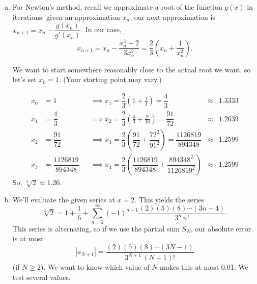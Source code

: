 \begin{solution}

	\begin{enumerate}[(a)]
		\item
		For Newton's method, recall we approximate a root of the function $g(x)$ in iterations: given an approximation $x_n$, our next approximation is $x_{n+1}=x_n-\dfrac{g(x_n)}{g'(x_n)}$. In our case,
\[x_{n+1}=x_n - \frac{x_n^3-2}{3x_n^2}=\frac23\left(x_n+\frac{1}{x_n^2}\right).\]

We want to start somewhere reasonably close to the actual root we want, so let's set $x_0=1$. (Your starting point may vary.)

\begin{align*}
x_0&=1 &&\implies x_1=\dfrac23\left(1+\frac11\right)=\dfrac{4}{3}&\approx&1.3333\\
 x_1&=\dfrac43 &&\implies x_2=\dfrac23\left(\frac43+\frac{9}{16}\right)=\dfrac{91}{72}&\approx&1.2639\\
  x_2&=\dfrac{91}{72} &&\implies x_3=\dfrac23\left(\dfrac{91}{72}+\dfrac{72^2}{91^2}\right)=\dfrac{1126819 }{894348 }&\approx&1.2599\\
    x_3&=\dfrac{1126819 }{894348 } &&\implies x_4=\dfrac23\left(\dfrac{1126819 }{894348 }+\dfrac{894348^2}{1126819^2}\right)&\approx&1.2599
\end{align*}
So, $\sqrt[3]{2}\approx 1.26$.
		\item
		We'll evaluate the given series at $x=2$. This yields the series
		\[\sqrt[3]{2}=1+\frac{1}{6}+\sum_{n=2}^\infty(-1)^{n-1}\frac{(2)(5)(8)\cdots(3n-4)}{3^n\, n!}.\]
		This series is alternating, so if we use the partial sum $S_N$, our absolute error is at most \[|a_{N+1}|=\frac{(2)(5)(8)\cdots(3N-1)}{3^{N+1}\, (N+1)!}\]
		(if $N \ge 2$). We want to know which value of $N$ makes this at most 0.01. We test several values.


\end{enumerate}
\end{solution}
